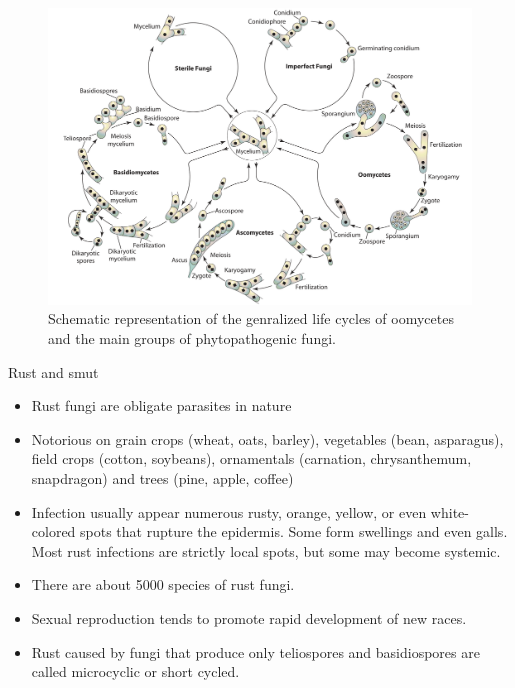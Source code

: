\documentclass[10pt,dvipsnames,ignorenonframetext,aspectratio=169]{beamer}
\providecommand{\tightlist}{%
  \setlength{\itemsep}{0pt}\setlength{\parskip}{0pt}}
\begin{document}
\begin{frame}{}
\protect\hypertarget{section-7}{}
\begin{figure}
\includegraphics[width=0.72\linewidth]{../images/generalized_life_cycle_pathogenic_fungi} \caption{Schematic representation of the genralized life cycles of oomycetes and the main groups of phytopathogenic fungi.}\label{fig:life-cycle-plant-pathogenic-fungi}
\end{figure}
\end{frame}

\begin{frame}{Rust and smut}
\protect\hypertarget{rust-and-smut}{}
\begin{itemize}
\tightlist
\item
  Rust fungi are obligate parasites in nature
\item
  Notorious on grain crops (wheat, oats, barley), vegetables (bean,
  asparagus), field crops (cotton, soybeans), ornamentals (carnation,
  chrysanthemum, snapdragon) and trees (pine, apple, coffee)
\item
  Infection usually appear numerous rusty, orange, yellow, or even
  white-colored spots that rupture the epidermis. Some form swellings
  and even galls. Most rust infections are strictly local spots, but
  some may become systemic.
\item
  There are about 5000 species of rust fungi.
\item
  Sexual reproduction tends to promote rapid development of new races.
\item
  Rust caused by fungi that produce only teliospores and basidiospores
  are called microcyclic or short cycled.
\end{itemize}
\end{frame}
\end{document}
